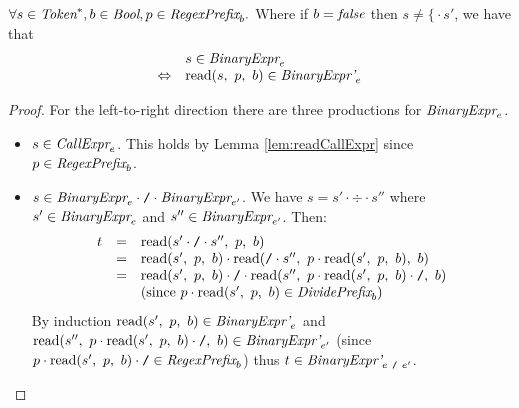 \documentclass[preprint,10pt]{sigplanconf}
\begin{document}
\begin{lemma}\mbox{}
  
  \( \forall s \in \textit{Token}^*, b \in \textit{Bool},  p \in \textit{RegexPrefix}_b. \)
  Where if \( b = \textit{false} \) then \( s \not = \texttt{\{} \cdot s' \), we have that
  \[
  \begin{array}{rl}
  &s \in \textit{BinaryExpr}_{e} 
  \\
  \Leftrightarrow &
  \textrm{read}(s,~p,~b) \in \textit{BinaryExpr'}_{e} 
  \end{array}
  \]

\end{lemma}
\begin{proof}
  For the left-to-right direction there are three productions for
  \( \textit{BinaryExpr}_{e} \).
  \begin{itemize}
  \item \( s \in \textit{CallExpr}_{e} \). This holds by Lemma
    \ref{lem:readCallExpr} since \( p \in \textit{RegexPrefix}_b \).

  \item \( s \in \textit{BinaryExpr}_{e} \cdot \texttt{/} \cdot \textit{BinaryExpr}_{e'}
    \). We have \( s = s' \cdot \div \cdot s'' \) where \( s' \in
    \textit{BinaryExpr}_{e} \) and \( s'' \in \textit{BinaryExpr}_{e'} \).
    Then:
    \[
    \begin{array}{rcl}
      t &=& \textrm{read}(s'\cdot \texttt{/} \cdot s'',~p,~b)
      \\
      &=& 
      \textrm{read}(s',~p,~b) \cdot 
      \textrm{read}(\texttt{/} \cdot s'',~
        p \cdot \textrm{read}(s',~p,~b)
      ,~b)
      \\
      &=& \textrm{read}(s',~p,~b) \cdot \texttt{/} \cdot 
      \textrm{read}(s'',~
        p \cdot \textrm{read}(s',~p,~b) \cdot \texttt{/}
      ,~b)
      \\ 
      && \textrm{(since \( p \cdot \textrm{read}(s',~p,~b) \in \textit{DividePrefix}_b \))}

    \end{array}
    \]
    By induction \( \textrm{read}(s',~p,~b) \in \textit{BinaryExpr'}_{e} \)
    and \( 
      \textrm{read}(s'',~
        p \cdot \textrm{read}(s',~p,~b) \cdot \texttt{/}
      ,~b) \in \textit{BinaryExpr'}_{e'}
      \) (since \( p \cdot \textrm{read}(s',~p,~b) \cdot \texttt{/} \in \textit{RegexPrefix}_b \)) thus \( t \in \textit{BinaryExpr'}_{e~\texttt{/}~e'} \).


\end{itemize}
\end{proof}
\end{document}
